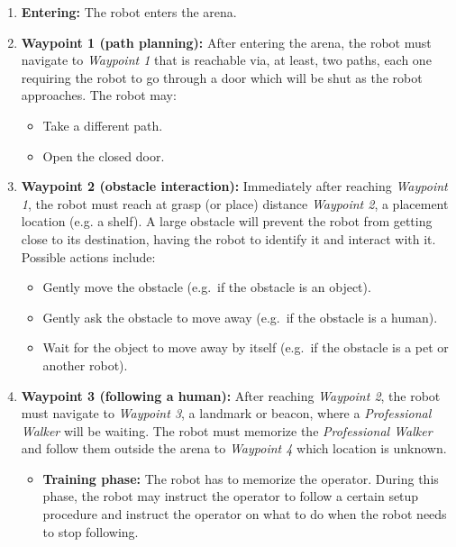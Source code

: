 \begin{enumerate}
	\item \textbf{Entering:} The robot enters the arena.

	\item \textbf{Waypoint 1 (path planning):} After entering the arena, the robot must navigate to \textit{Waypoint 1} that is reachable via, at least, two paths, each one requiring the robot to go through a door which will be shut as the robot approaches. The robot may:
	\begin{itemize}
		\item Take a different path.
		\item Open the closed door.
	\end{itemize}

	\item \textbf{Waypoint 2 (obstacle interaction):} Immediately after reaching \textit{Waypoint 1}, the robot must reach at grasp (or place) distance \textit{Waypoint 2}, a placement location (e.g. a shelf). A large obstacle will prevent the robot from getting close to its destination, having the robot to identify it and interact with it.
	Possible actions include:
	\begin{itemize}
		\item Gently move the obstacle (e.g.~if the obstacle is an object).
		\item Gently ask the obstacle to move away (e.g.~if the obstacle is a human).
		\item Wait for the object to move away by itself (e.g.~if the obstacle is a pet or another robot).
	\end{itemize}

	\item \textbf{Waypoint 3 (following a human):} After reaching \textit{Waypoint 2}, the robot must navigate to \textit{Waypoint 3}, a landmark or beacon, where a \textit{Professional Walker} will be waiting. The robot must memorize the \textit{Professional Walker} and follow them outside the arena to \textit{Waypoint 4} which location is unknown.
	\begin{itemize}
		\item \textbf{Training phase:} The robot has to memorize the operator. During this phase, the robot may instruct the operator to follow a certain setup procedure and instruct the operator on what to do when the robot needs to stop following.
		

\end{itemize}
\end{enumerate}
